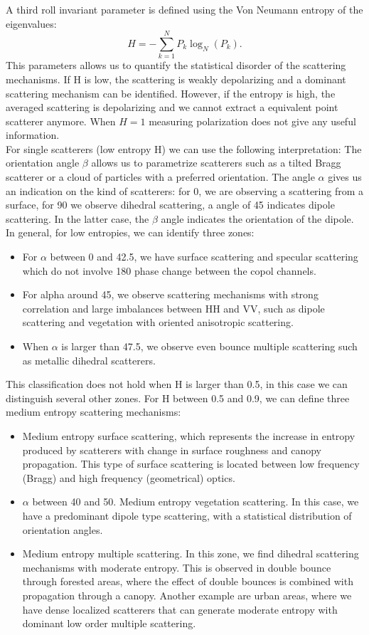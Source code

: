 \documentclass[11pt]{article}
\begin{document}
A third roll invariant parameter is defined using the Von Neumann entropy of the eigenvalues:
\begin{equation}
	H = - \sum_{k=1}^{N}P_{k}\log_{N}{\left(P_{k}\right)}.
\end{equation}
This parameters allows us to quantify the statistical disorder of the scattering mechanisms. If H is low, the scattering is weakly depolarizing and a dominant scattering mechanism can be identified. However, if the entropy is high, the averaged scattering is depolarizing and we cannot extract a equivalent point scatterer anymore. When $H =1$ measuring polarization does not give any useful information.\\
 For single scatterers (low entropy H) we can use the following interpretation:
 The orientation angle $\beta$ allows us to parametrize scatterers such as a tilted Bragg scatterer or a cloud of particles with a preferred orientation. The angle $\alpha$ gives us an indication on the kind of scatterers: for 0, we are observing a scattering from a surface, for 90 we observe dihedral scattering, a angle of 45 indicates dipole scattering. In the latter case, the $\beta$ angle indicates the orientation of the dipole.
In general, for low entropies, we can identify three zones:
\begin{itemize}
	\item For $\alpha$ between 0 and 42.5, we have surface scattering and specular scattering which do not 	involve 180 phase change between the copol channels.
\item For alpha around 45, we observe scattering mechanisms with strong correlation and large imbalances between HH and VV, such as dipole scattering and vegetation with oriented anisotropic scattering.
\item When $\alpha$ is larger than 47.5, we observe even bounce multiple scattering such as metallic dihedral scatterers.
\end{itemize}
This classification does not hold when H is larger than 0.5, in this case we can distinguish several other zones.
For H between 0.5 and 0.9, we can define three medium entropy scattering mechanisms:
\begin{itemize}
\item Medium entropy surface scattering, which represents the increase in entropy produced by scatterers with change in surface roughness and canopy propagation.  This type of surface scattering is located between low frequency (Bragg) and high frequency (geometrical) optics.
\item $\alpha$ between 40 and 50. Medium entropy vegetation scattering. In this case, we have a predominant dipole type scattering, with a statistical distribution of orientation angles.
\item Medium entropy multiple scattering. In this zone, we find dihedral scattering mechanisms with moderate entropy. This is observed in double bounce through forested areas, where the effect of double bounces is combined with propagation through a canopy. Another example are urban areas, where we have dense localized scatterers that can generate moderate entropy with dominant low order multiple scattering.
\end{itemize}
\end{document}

